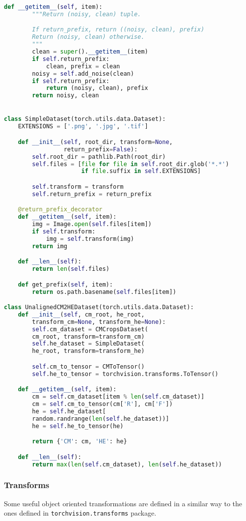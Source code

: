\documentclass[../main.tex]{subfiles}
\begin{document}
\begin{lstlisting}[language=Python]
    def __getitem__(self, item):
        """Return (noisy, clean) tuple.

        If return_prefix, return ((noisy, clean), prefix)
        Return (noisy, clean) otherwise.
        """
        clean = super().__getitem__(item)
        if self.return_prefix:
            clean, prefix = clean
        noisy = self.add_noise(clean)
        if self.return_prefix:
            return (noisy, clean), prefix
        return noisy, clean


class SimpleDataset(torch.utils.data.Dataset):
    EXTENSIONS = ['.png', '.jpg', '.tif']

    def __init__(self, root_dir, transform=None,
                 return_prefix=False):
        self.root_dir = pathlib.Path(root_dir)
        self.files = [file for file in self.root_dir.glob('*.*')
                      if file.suffix in self.EXTENSIONS]

        self.transform = transform
        self.return_prefix = return_prefix

    @return_prefix_decorator
    def __getitem__(self, item):
        img = Image.open(self.files[item])
        if self.transform:
            img = self.transform(img)
        return img

    def __len__(self):
        return len(self.files)

    def get_prefix(self, item):
        return os.path.basename(self.files[item])

class UnalignedCM2HEDataset(torch.utils.data.Dataset):
    def __init__(self, cm_root, he_root,
        transform_cm=None, transform_he=None):
        self.cm_dataset = CMCropsDataset(
		cm_root, transform=transform_cm)
        self.he_dataset = SimpleDataset(
		he_root, transform=transform_he)

        self.cm_to_tensor = CMToTensor()
        self.he_to_tensor = torchvision.transforms.ToTensor()

    def __getitem__(self, item):
        cm = self.cm_dataset[item % len(self.cm_dataset)]
        cm = self.cm_to_tensor(cm['R'], cm['F'])
        he = self.he_dataset[
		random.randrange(len(self.he_dataset))]
        he = self.he_to_tensor(he)

        return {'CM': cm, 'HE': he}

    def __len__(self):
        return max(len(self.cm_dataset), len(self.he_dataset))

\end{lstlisting}

\subsubsection{Transforms}
Some useful object oriented transformations are defined in a similar way
to the ones defined in \verb|torchvision.transforms| package.
\end{document}
